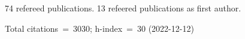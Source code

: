 74 refereed publications. 13 refeered publications as first author.

Total citations~=~3030; h-index~=~30 (2022-12-12)